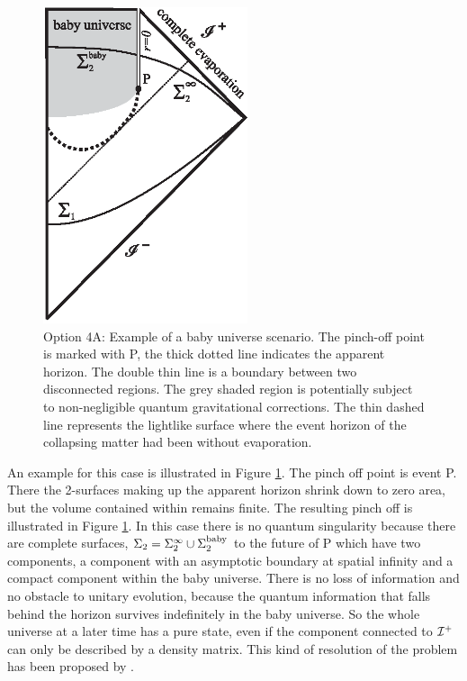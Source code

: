 \documentclass[12pt]{article}
\begin{document}
\begin{figure}[ht]
\centering \includegraphics[width=6cm]{evap5.eps}

\caption{Option 4A: Example of a  baby universe scenario. The pinch-off point is marked with P, the thick dotted line
indicates the apparent horizon. The double thin line is a boundary between two disconnected regions. The grey shaded 
region is potentially subject to non-negligible quantum gravitational corrections.  The thin dashed line represents the lightlike surface where the event horizon of the collapsing matter 
had been without evaporation. 
\label{fig3}}
\end{figure}

An example for this case is illustrated in Figure \ref{fig3}. The pinch off point is event P. There the 2-surfaces
making up the apparent horizon shrink down to zero area, but the volume contained within remains finite. The resulting  pinch off is illustrated in Figure \ref{fig3}. In this case there is no quantum singularity because there are complete surfaces, $\Sigma_2= \Sigma_2^{\infty} \cup \Sigma_2^{{\rm baby}} $  to the future of P which have two components, a component with an asymptotic boundary at spatial infinity and a compact component within the baby universe. 
There is no loss of information and no obstacle to unitary evolution, because the quantum information that falls behind the horizon survives indefinitely in the baby universe.  So the whole universe at a later time has a pure state, even if the component connected to 
${\cal I}^+$ can only be described by a density matrix.  This kind of resolution of the problem has been proposed by 
\cite{Frolov:1988vj,Frolov:1989pf,Hsu:2007dr,Hsu:2006pe}.  
\end{document}
